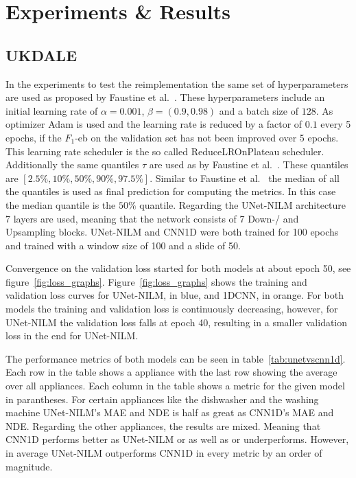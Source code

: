 \documentclass[sigconf]{acmart}
\begin{document}
\section{Experiments \& Results}\label{chapter:expiraments}
\subsection{UKDALE}\label{subchapter:ukdale}
In the experiments to test the reimplementation the same set of hyperparameters are used as proposed by Faustine et al.~\cite{unetnilm}.
These hyperparameters include an initial learning rate of $\alpha=0.001$, $\beta=(0.9,0.98)$ and a batch size of $128$. 
As optimizer Adam is used and the learning rate is reduced by a factor of $0.1$ every 5 epochs, if the $F_1$-eb on the 
validation set has not been improved over 5 epochs. This learning rate scheduler is the so called ReduceLROnPlateau scheduler.
Additionally the same quantiles $\tau$ are used as by Faustine et al.~\cite{unetnilm}. These quantiles are $[2.5\%,10\%,50\%,90\%,97.5\%]$. 
Similar to Faustine et al.~\cite{unetnilm} the median of all the quantiles is used as final prediction for computing the metrics.
In this case the median quantile is the $50\%$ quantile.
Regarding the UNet-NILM architecture 7 layers are used, meaning that the network consists of 7 Down-/ and Upsampling blocks.
UNet-NILM and CNN1D were both trained for 100 epochs and trained with a window size of 100 and a slide of 50. 

Convergence on the validation loss started for both models at about epoch 50, see figure~\ref{fig:loss_graphs}.
Figure~\ref{fig:loss_graphs} shows the training and validation loss curves for UNet-NILM, in blue, and 1DCNN, in orange.
For both models the training and validation loss is continuously decreasing, however, for UNet-NILM the validation loss falls at 
epoch 40, resulting in a smaller validation loss in the end for UNet-NILM.

The performance metrics of both models can be seen in table~\ref{tab:unetvscnn1d}. 
Each row in the table shows a appliance with the last row showing the average over all appliances.
Each column in the table shows a metric for the given model in parantheses. 
For certain appliances like the dishwasher and the washing machine UNet-NILM's MAE and NDE is half as great as CNN1D's MAE and NDE.
Regarding the other appliances, the results are mixed. Meaning that CNN1D performs better as UNet-NILM or as well as or underperforms. 
However, in average UNet-NILM outperforms CNN1D in every metric by an order of magnitude.
\end{document}
